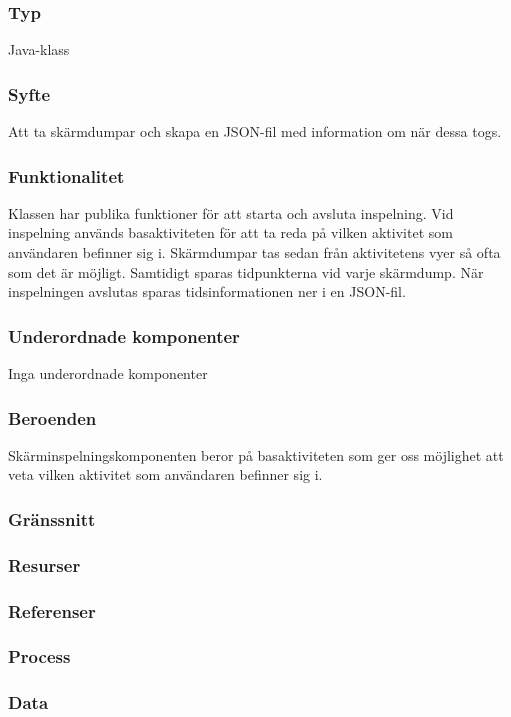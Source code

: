 \subsubsection{Typ}
Java-klass
\subsubsection{Syfte}
Att ta skärmdumpar och skapa en JSON-fil med information om när dessa togs.
\subsubsection{Funktionalitet}
Klassen har publika funktioner för att starta och avsluta inspelning. Vid inspelning används basaktiviteten för att ta reda på vilken aktivitet som användaren befinner sig i. Skärmdumpar tas sedan från aktivitetens vyer så ofta som det är möjligt. Samtidigt sparas tidpunkterna vid varje skärmdump. När inspelningen avslutas sparas tidsinformationen ner i en JSON-fil.
\subsubsection{Underordnade komponenter}
Inga underordnade komponenter
\subsubsection{Beroenden}
Skärminspelningskomponenten beror på basaktiviteten som ger oss möjlighet att veta vilken aktivitet som användaren befinner sig i.
\subsubsection{Gränssnitt}

\subsubsection{Resurser}

\subsubsection{Referenser}

\subsubsection{Process}

\subsubsection{Data}
